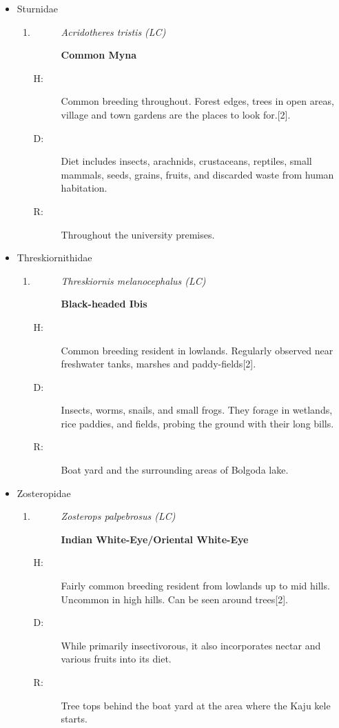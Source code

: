 \begin{itemize}
\item%
Sturnidae%
\begin{enumerate}%
\item%
\begin{description}%
\item[]%
\textit{Acridotheres tristis (LC)}%
\item[]%
\textbf{Common Myna}%
\end{description}%
\begin{description}%
\item[H: ]%
Common breeding throughout. Forest edges, trees in open areas, village and town gardens are the places to look for.{[}2{]}.%
\item[D: ]%
Diet includes insects, arachnids, crustaceans, reptiles, small mammals, seeds, grains, fruits, and discarded waste from human habitation.%
\item[R: ]%
Throughout the university premises.%
\end{description}%
\end{enumerate}%
\item%
Threskiornithidae%
\begin{enumerate}%
\item%
\begin{description}%
\item[]%
\textit{Threskiornis melanocephalus (LC)}%
\item[]%
\textbf{Black{-}headed Ibis}%
\end{description}%
\begin{description}%
\item[H: ]%
Common breeding resident in lowlands. Regularly observed near freshwater tanks, marshes and paddy-fields{[}2{]}.%
\item[D: ]%
Insects, worms, snails, and small frogs. They forage in wetlands, rice paddies, and fields, probing the ground with their long bills.%
\item[R: ]%
Boat yard and the surrounding areas of Bolgoda lake.%
\end{description}%
\end{enumerate}%
\item%
Zosteropidae%
\begin{enumerate}%
\item%
\begin{description}%
\item[]%
\textit{Zosterops palpebrosus (LC)}%
\item[]%
\textbf{Indian White{-}Eye/Oriental White{-}Eye}%
\end{description}%
\begin{description}%
\item[H: ]%
Fairly common breeding resident from lowlands up to mid hills. Uncommon in high hills. Can be seen around trees{[}2{]}.%
\item[D: ]%
While primarily insectivorous, it also incorporates nectar and various fruits into its diet.%
\item[R: ]%
Tree tops behind the boat yard at the area where the Kaju kele starts.%
\end{description}%
\end{enumerate}%
\end{itemize}

